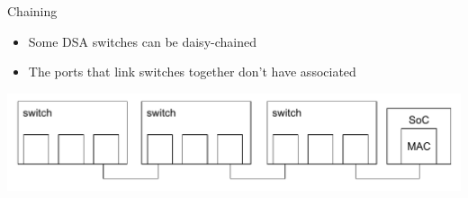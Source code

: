 \begin{frame}{Chaining}
	\begin{itemize}
		\item Some DSA switches can be daisy-chained
		\item The ports that link switches together don't have associated 
	\end{itemize}
	\includegraphics[width=\textwidth]{slides/networking-driver-switch/chained.pdf}
\end{frame}

